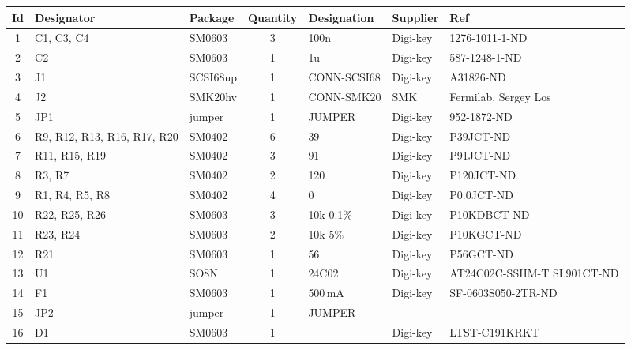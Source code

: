 {\footnotesize
\begin{tabular}{cp{2.2cm}lclll}
	\toprule %
Id & Designator                 & Package  & Quantity & Designation & Supplier & Ref \\ 
	\midrule %
1 & C1, C3, C4                  & SM0603   &        3 &        100n & Digi-key & 1276-1011-1-ND \\ 
2 & C2                          & SM0603   &        1 &          1u & Digi-key & 587-1248-1-ND \\ 
3 & J1                          & SCSI68up &        1 & CONN-SCSI68 & Digi-key & A31826-ND \\ 
4 & J2                          & SMK20hv  &        1 &  CONN-SMK20 & SMK      & Fermilab, Sergey Los \\ 
5 & JP1                         & jumper   &        1 &      JUMPER & Digi-key & 952-1872-ND \\ 
6 & R9, R12, R13, R16, R17, R20 & SM0402   &        6 &          39 & Digi-key & P39JCT-ND \\ 
7 & R11, R15, R19               & SM0402   &        3 &          91 & Digi-key & P91JCT-ND \\ 
8 & R3, R7                      & SM0402   &        2 &         120 & Digi-key & P120JCT-ND \\ 
9 & R1, R4, R5, R8              & SM0402   &        4 &           0 & Digi-key & P0.0JCT-ND \\ 
10 & R22, R25, R26              & SM0603   &        3 &   10k 0.1\% & Digi-key & P10KDBCT-ND \\ 
11 & R23, R24                   & SM0603   &        2 &     10k 5\% & Digi-key & P10KGCT-ND \\ 
12 & R21                        & SM0603   &        1 &          56 & Digi-key & P56GCT-ND \\ 
13 & U1                         & SO8N     &        1 &       24C02 & Digi-key & AT24C02C-SSHM-T SL901CT-ND \\ 
14 & F1                         & SM0603   &        1 &     500\,mA & Digi-key & SF-0603S050-2TR-ND \\ 
15 & JP2                        & jumper   &        1 &      JUMPER & & \\ 
16 & D1                         & SM0603   &        1 &             & Digi-key & LTST-C191KRKT \\ 
	\bottomrule %
\end{tabular}
}

